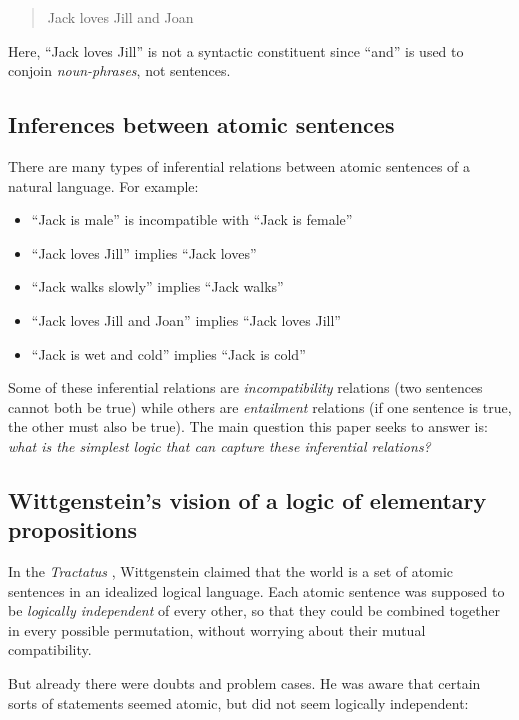 \begin{quote}
  Jack loves Jill and Joan
\end{quote}

\NI Here, ``Jack loves Jill'' is not a syntactic constituent since
``and'' is used to conjoin \emph{noun-phrases}, not sentences.

\subsection{Inferences between atomic sentences}

\NI There are many types of inferential relations between atomic
sentences of a natural language.  For example:

\begin{itemize}

\item ``Jack is male'' is incompatible with ``Jack is female''
\item ``Jack loves Jill'' implies ``Jack loves''
\item ``Jack walks slowly'' implies ``Jack walks''
\item ``Jack loves Jill and Joan'' implies ``Jack loves Jill''
\item ``Jack is wet and cold'' implies ``Jack is cold''

\end{itemize}

\NI Some of these inferential relations are \emph{incompatibility}
relations (two sentences cannot both be true) while others are
\emph{entailment} relations (if one sentence is true, the other must
also be true).  The main question this paper seeks to answer is:
\emph{what is the simplest logic that can capture these inferential
  relations?}

\subsection{Wittgenstein's vision of a logic of elementary propositions}

\NI In the \emph{Tractatus} \cite{wittgenstein-tractatus}, Wittgenstein
claimed that the world is a set of atomic sentences in an idealized
logical language.  Each atomic sentence was supposed to be
\emph{logically independent} of every other, so that they could be
combined together in every possible permutation, without worrying
about their mutual compatibility.

But already there were doubts and problem cases.  He was aware that
certain sorts of statements seemed atomic, but did not seem logically
independent:

